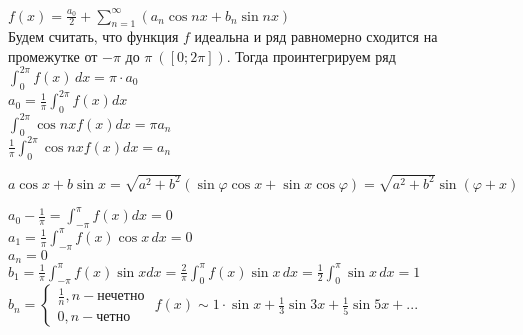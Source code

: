 \begin{Prop}
	$f(x) = \frac{a_0}{2} + \sum_{n=1}^{\infty} (a_n \cos nx + b_n \sin nx)$\\
    Будем считать, что функция $f$ идеальна и ряд равномерно сходится на промежутке от $- \pi$ до $\pi \ ([0; 2\pi])$. 
    Тогда проинтегрируем ряд $\int_{0}^{2\pi} f(x) \, dx = \pi \cdot a_0$\\
    $a_0 = \frac{1}{\pi} \int_{0}^{2\pi} f(x) dx$\\
    $\int_{0}^{2\pi} \cos nx f(x) dx = \pi a_n$\\
    $\frac{1}{\pi} \int_{0}^{2\pi} \cos nx f(x) dx = a_n$
\end{Prop}

\begin{Rem}
    $a \cos x + b \sin x = \sqrt{a^2 + b^2} (\sin \varphi \cos x + \sin x \cos \varphi) = \sqrt{a^2 + b^2} \sin (\varphi + x)$
\end{Rem}

\begin{Example}
    $a_0 - \frac{1}{\pi} = \int_{-\pi}^{\pi} f(x) dx = 0$\\
	$a_1 = \frac{1}{\pi} \int_{-\pi}^{\pi} f(x) \cos x \, dx = 0$\\
	$a_n = 0$\\
	$b_1 = \frac{1}{\pi} \int_{-\pi}^{\pi} f(x) \sin x dx = \frac{2}{\pi} \int_{0}^{\pi} f(x) \sin x \, dx = \frac{1}{2} \int_{0}^{\pi} \sin x \, dx = 1$\\
	$b_n = \begin{cases}
		\frac{1}{n}, n - \text{нечетно}\\
		0, n - \text{четно}
	\end{cases}$
	$f(x) \sim 1 \cdot \sin x + \frac{1}{3} \sin 3x + \frac{1}{5} \sin 5x + ...$
\end{Example}

